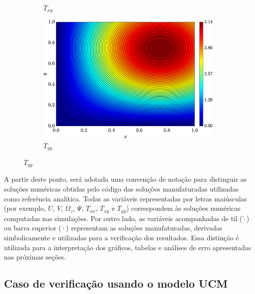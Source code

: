 \begin{figure}[H]
\begin{subfigure}[b]{.47\textwidth}
            \caption{$\overline{T}_{xy}$}
            \label{fig_solexatxystreamlineCase1}
        \end{subfigure}
        \vspace{0.2cm}
        \begin{subfigure}[b]{.47\textwidth}
            \includegraphics[width=\textwidth]{figures/Case12/UCM/Solutions/Exact_Map_NormErr_2nd_Betann_0.1_Re_1_Wi_1_epsilon_0_xi_0_alphaG_0_Dt_1e-06_at_0.05_tipsim_1_MMS_12_Tyy.eps}
            \caption{$\overline{T}_{yy}$}
            \label{fig_solexatyystreamlineCase1}
        \end{subfigure}
        \fdadospesquisa
\end{figure}

A partir deste ponto, será adotada uma convenção de notação para distinguir as soluções numéricas obtidas pelo código das soluções manufaturadas utilizadas como referência analítica. Todas as variáveis representadas por letras maiúsculas (por exemplo, $U$, $V$, $\Omega_z$, $\Psi$, $T_{xx}$, $T_{xy}$ e $T_{yy}$) correspondem às soluções numéricas computadas nas simulações. Por outro lado, as variáveis acompanhadas de til ($\widetilde{\cdot}$) ou barra superior ($\overline{\cdot}$) representam as soluções manufaturadas, derivadas simbolicamente e utilizadas para a verificação dos resultados. Essa distinção é utilizada para a interpretação dos gráficos, tabelas e análises de erro apresentadas nas próximas seções.

\subsection{Caso de verificação usando o modelo UCM}

